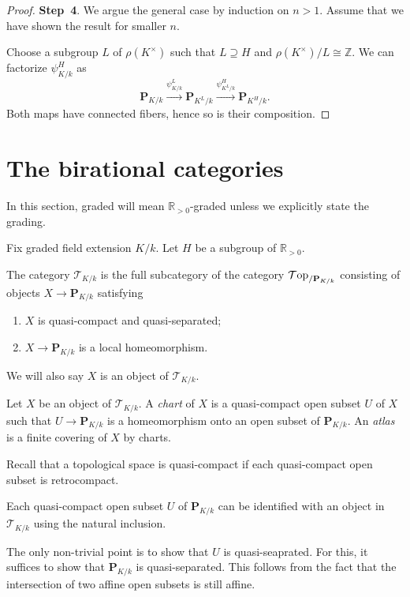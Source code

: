\begin{proof}
    \textbf{Step~4}. We argue the general case by induction on $n>1$. Assume that we have shown the result for smaller $n$.

    Choose a subgroup $L$ of $\rho(K^{\times})$ such that $L\supseteq H$ and $\rho(K^{\times})/L\cong \mathbb{Z}$. 
    We can factorize $\psi_{K/k}^H$ as
    \[
        \mathbf{P}_{K/k}\xrightarrow{\psi_{K/k}^L}   \mathbf{P}_{K^L/k}\xrightarrow{\psi_{K^L/k}^H}\mathbf{P}_{K^H/k}.
    \]
    Both maps have connected fibers, hence so is their composition.
\end{proof}

\section{The birational categories}
In this section, graded will mean $\mathbb{R}_{>0}$-graded unless we explicitly state the grading.

Fix graded field extension $K/k$. Let $H$ be a subgroup of $\mathbb{R}_{>0}$. 

\begin{definition}
    The category $\mathcal{T}_{K/k}$ is the full subcategory of the category $\mathcal{T}\mathrm{op}_{/\mathbf{P}_{K/k}}$ consisting of objects $X\rightarrow \mathbf{P}_{K/k}$ satisfying
    \begin{enumerate}
        \item $X$ is quasi-compact and quasi-separated;
        \item $X\rightarrow \mathbf{P}_{K/k}$ is a local homeomorphism.
    \end{enumerate}

    We will also say $X$ is an object of  $\mathcal{T}_{K/k}$.

    Let $X$ be an object of $\mathcal{T}_{K/k}$. A \emph{chart} of $X$ is a quasi-compact open subset $U$ of $X$ such that $U\rightarrow \mathbf{P}_{K/k}$ is a homeomorphism onto an open subset of $\mathbf{P}_{K/k}$. An \emph{atlas} is a finite covering of $X$ by charts.
\end{definition}
Recall that a topological space is quasi-compact if each quasi-compact open subset is retrocompact.

\begin{example}
    Each quasi-compact open subset $U$ of $\mathbf{P}_{K/k}$ can be identified with an object in $\mathcal{T}_{K/k}$ using the natural inclusion.

    The only non-trivial point is to show that $U$ is quasi-seaprated. For this, it suffices to show that $\mathbf{P}_{K/k}$ is quasi-separated. This follows from the fact that the intersection of two affine open subsets is still affine.
\end{example}

